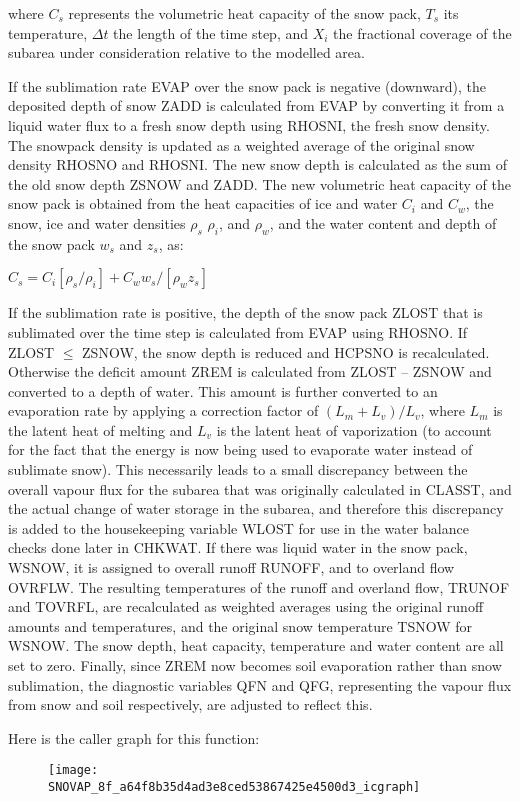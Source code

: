 where $C_s$ represents the volumetric heat capacity of the snow pack, $T_s$ its temperature, $\Delta t$ the length of the time step, and $X_i$ the fractional coverage of the subarea under consideration relative to the modelled area.

If the sublimation rate E\+V\+A\+P over the snow pack is negative (downward), the deposited depth of snow Z\+A\+D\+D is calculated from E\+V\+A\+P by converting it from a liquid water flux to a fresh snow depth using R\+H\+O\+S\+N\+I, the fresh snow density. The snowpack density is updated as a weighted average of the original snow density R\+H\+O\+S\+N\+O and R\+H\+O\+S\+N\+I. The new snow depth is calculated as the sum of the old snow depth Z\+S\+N\+O\+W and Z\+A\+D\+D. The new volumetric heat capacity of the snow pack is obtained from the heat capacities of ice and water $C_i$ and $C_w$, the snow, ice and water densities $\rho_s$ $\rho_i$, and $\rho_w$, and the water content and depth of the snow pack $w_s$ and $z_s$, as\+:

$C_s = C_i [\rho_s / \rho_i ] + C_w w_s /[\rho_w z_s]$

If the sublimation rate is positive, the depth of the snow pack Z\+L\+O\+S\+T that is sublimated over the time step is calculated from E\+V\+A\+P using R\+H\+O\+S\+N\+O. If Z\+L\+O\+S\+T $\leq$ Z\+S\+N\+O\+W, the snow depth is reduced and H\+C\+P\+S\+N\+O is recalculated. Otherwise the deficit amount Z\+R\+E\+M is calculated from Z\+L\+O\+S\+T – Z\+S\+N\+O\+W and converted to a depth of water. This amount is further converted to an evaporation rate by applying a correction factor of $(L_m+ L_v)/L_v$, where $L_m$ is the latent heat of melting and $L_v$ is the latent heat of vaporization (to account for the fact that the energy is now being used to evaporate water instead of sublimate snow). This necessarily leads to a small discrepancy between the overall vapour flux for the subarea that was originally calculated in C\+L\+A\+S\+S\+T, and the actual change of water storage in the subarea, and therefore this discrepancy is added to the housekeeping variable W\+L\+O\+S\+T for use in the water balance checks done later in C\+H\+K\+W\+A\+T. If there was liquid water in the snow pack, W\+S\+N\+O\+W, it is assigned to overall runoff R\+U\+N\+O\+F\+F, and to overland flow O\+V\+R\+F\+L\+W. The resulting temperatures of the runoff and overland flow, T\+R\+U\+N\+O\+F and T\+O\+V\+R\+F\+L, are recalculated as weighted averages using the original runoff amounts and temperatures, and the original snow temperature T\+S\+N\+O\+W for W\+S\+N\+O\+W. The snow depth, heat capacity, temperature and water content are all set to zero. Finally, since Z\+R\+E\+M now becomes soil evaporation rather than snow sublimation, the diagnostic variables Q\+F\+N and Q\+F\+G, representing the vapour flux from snow and soil respectively, are adjusted to reflect this.

Here is the caller graph for this function\+:\nopagebreak
\begin{figure}[H]
\begin{center}
\leavevmode
\texttt{[image: SNOVAP\_8f\_a64f8b35d4ad3e8ced53867425e4500d3\_icgraph]}
\end{center}
\end{figure}


